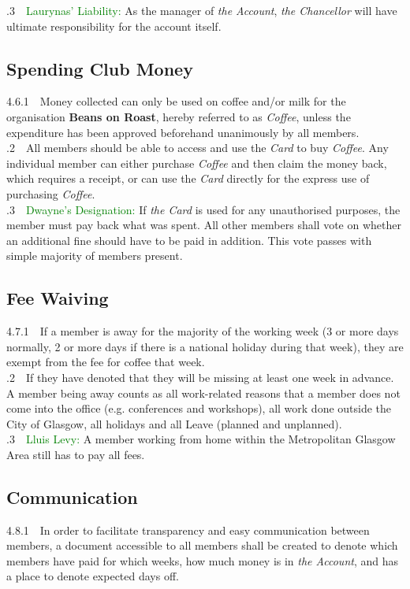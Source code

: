 \documentclass[a4paper,11pt]{article}
\begin{document}
.3$\quad$\textcolor{green}{Laurynas' Liability:} As the manager of \textit{the Account}, \textit{the Chancellor} will have ultimate responsibility for the account itself. 

\subsection{Spending Club Money}
4.6.1$\quad$Money collected can only be used on coffee and/or milk for the organisation \textbf{Beans on Roast}, hereby referred to as \textit{Coffee}, unless the expenditure has been approved beforehand unanimously by all members. \\

.2$\quad$All members should be able to access and use the \textit{Card} to buy \textit{Coffee}. Any individual member can either purchase \textit{Coffee} and then claim the money back, which requires a receipt, or can use the \textit{Card} directly for the express use of purchasing \textit{Coffee}.\\

.3$\quad$\textcolor{green}{Dwayne's Designation:} If \textit{the Card} is used for any unauthorised purposes, the member must pay back what was spent. All other members shall vote on whether an additional fine should have to be paid in addition. This vote passes with simple majority of members present.

\subsection{Fee Waiving}
4.7.1$\quad$If a member is away for the majority of the working week (3 or more days normally, 2 or more days if there is a national holiday during that week), they are exempt from the fee for coffee that week.\\

.2$\quad$If they have denoted that they will be missing at least one week in advance. A member being away counts as all work-related reasons that a member does not come into the office (e.g. conferences and workshops), all work done outside the City of Glasgow, all holidays and all Leave (planned and unplanned).\\

.3$\quad$\textcolor{green}{Lluis Levy:} A member working from home within the Metropolitan Glasgow Area still has to pay all fees.

\subsection{Communication}
4.8.1$\quad$In order to facilitate transparency and easy communication between members, a document accessible to all members shall be created to denote which members have paid for which weeks, how much money is in \textit{the Account}, and has a place to denote expected days off.\\
\end{document}
